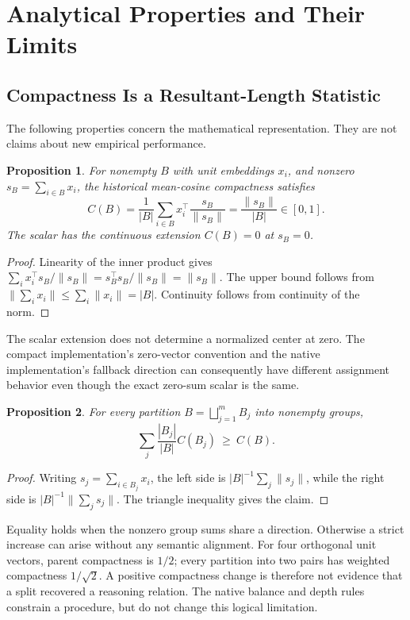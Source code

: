 \documentclass[11pt,a4paper]{article}
\newtheorem{proposition}{Proposition}
\begin{document}
\section{Analytical Properties and Their Limits}
\label{sec:theory}
\subsection{Compactness Is a Resultant-Length Statistic}
The following properties concern the mathematical representation. They are
not claims about new empirical performance.
\begin{proposition}
For nonempty $B$ with unit embeddings $x_i$, and nonzero
$s_B=\sum_{i\in B}x_i$, the historical mean-cosine compactness satisfies
\begin{equation}
C(B)=\frac{1}{|B|}\sum_{i\in B}x_i^\top\frac{s_B}{\|s_B\|}
     =\frac{\|s_B\|}{|B|}\in[0,1].
\end{equation}
The scalar has the continuous extension $C(B)=0$ at $s_B=0$.
\end{proposition}
\begin{proof}
Linearity of the inner product gives
$\sum_i x_i^\top s_B/\|s_B\|=s_B^\top s_B/\|s_B\|=\|s_B\|$.
The upper bound follows from $\|\sum_i x_i\|\leq\sum_i\|x_i\|=|B|$.
Continuity follows from continuity of the norm.
\end{proof}
The scalar extension does not determine a normalized center at zero.
The compact implementation's zero-vector convention and the native
implementation's fallback direction can consequently have different
assignment behavior even though the exact zero-sum scalar is the same.

\begin{proposition}
For every partition $B=\bigsqcup_{j=1}^m B_j$ into nonempty groups,
\begin{equation}
\sum_j\frac{|B_j|}{|B|}C(B_j)\ \geq\ C(B).
\label{eq:partition}
\end{equation}
\end{proposition}
\begin{proof}
Writing $s_j=\sum_{i\in B_j}x_i$, the left side is
$|B|^{-1}\sum_j\|s_j\|$, while the right side is
$|B|^{-1}\|\sum_j s_j\|$. The triangle inequality gives the claim.
\end{proof}
Equality holds when the nonzero group sums share a direction. Otherwise a
strict increase can arise without any semantic alignment. For four
orthogonal unit vectors, parent compactness is $1/2$; every partition into
two pairs has weighted compactness $1/\sqrt{2}$. A positive compactness change
is therefore not evidence that a split recovered a reasoning relation.
The native balance and depth rules constrain a procedure, but do not change
this logical limitation.
\end{document}
